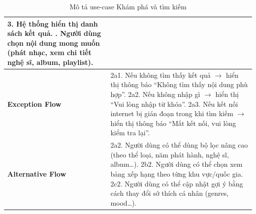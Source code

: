 \documentclass[a4paper]{article}
\begin{document}
\begin{table}[H]
\begin{tabularx}{\textwidth}{|l|X|}
		3. Hệ thống hiển thị danh sách kết quả. \newline
		4. Người dùng chọn nội dung mong muốn (phát nhạc, xem chi tiết nghệ sĩ, album, playlist).                                                                                     \\ \hline
		\textbf{Exception Flow}
		                       & 2a1. Nếu không tìm thấy kết quả $\rightarrow$ hiển thị thông báo “Không tìm thấy nội dung phù hợp”. \newline
		2a2. Nếu không nhập gì $\rightarrow$ hiển thị “Vui lòng nhập từ khóa”. \newline
		2a3. Nếu kết nối internet bị gián đoạn trong khi tìm kiếm $\rightarrow$ hiển thị thông báo “Mất kết nối, vui lòng kiểm tra lại”.											  \\ \hline
		\textbf{Alternative Flow}
		                       & 2a2. Người dùng có thể dùng bộ lọc nâng cao (theo thể loại, năm phát hành, nghệ sĩ, album…). \newline
		2b2. Người dùng có thể chọn xem bảng xếp hạng theo từng khu vực/quốc gia. \newline
		2c2. Người dùng có thể cập nhật gợi ý bằng cách thay đổi sở thích cá nhân (genres, mood…).                                                                                    \\ \hline
	\end{tabularx}
	\caption{Mô tả use-case Khám phá và tìm kiếm}
\end{table}

\end{document}
